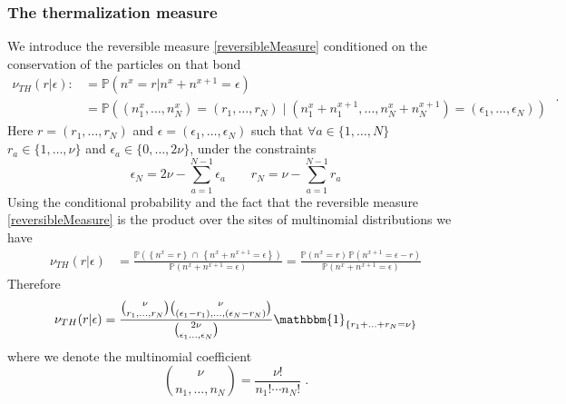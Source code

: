 \documentclass[10pt]{article}
\numberwithin{equation}{section}
\numberwithin{equation}{subsection}
\newcommand{\dt}{\;.}
\begin{document}
\subsubsection{The thermalization measure}
We introduce the reversible measure \eqref{reversibleMeasure} conditioned on the conservation of the particles on that bond
\begin{equation}
	\begin{split}
	\nu_{TH}(r|\epsilon):&=\mathbb{P}\left(n^{x}=r|n^{x}+n^{x+1}=\epsilon\right)
	\\&
	=\mathbb{P}\left((n_{1}^{x},\ldots,n_{N}^{x})=
	(r_{1},\ldots,r_{N})\;|\;(n_{1}^{x}+n_{1}^{x+1},\ldots,n_{N}^{x}+n_{N}^{x+1})=(\epsilon_{1},\ldots,\epsilon_{N})\right)
	\end{split}\dt
\end{equation}
Here $r=(r_{1},\ldots,r_{N})$ and  $\epsilon=(\epsilon_{1},\ldots,\epsilon_{N})$ such that $\forall a\in\{1,\ldots,N\}$  $r_{a}\in \{1,\ldots,\nu\}$ and $\epsilon_{a}\in \{0,\ldots,2\nu\}$, under the constraints 
\begin{equation}
	\epsilon_{N}=2\nu-\sum_{a=1}^{N-1}\epsilon_{a}\qquad r_{N}=\nu-\sum_{a=1}^{N-1}r_{a}
\end{equation}
 Using the conditional probability and the fact that the reversible measure \eqref{reversibleMeasure} is the product over the sites of multinomial distributions we have
\begin{equation}
	\begin{split}
\nu_{TH}(r|\epsilon)&=\frac{\mathbb{P}\left(\left\{n^{x}=r\right\}\,\cap\,\left\{n^{x}+n^{x+1}=\epsilon\right\}\right)}{\mathbb{P}\left(n^{x}+n^{x+1}=\epsilon\right)}=\frac{\mathbb{P}\left(n^{x}=r\right)\,\mathbb{P}\left(n^{x+1}=\epsilon-r\right)}{\mathbb{P}\left(n^{x}+n^{x+1}=\epsilon\right)}
	\end{split}
\end{equation}
Therefore 
\begin{equation}
	\begin{split}
	\nu_{TH}(r|\epsilon)=\frac{\binom{\nu}{r_{1},\ldots,r_{N}}\binom{\nu}{(\epsilon_{1}-r_{1}),\ldots,(\epsilon_{N}-r_{N})}}{\binom{2\nu}{\epsilon_{1}\ldots,\epsilon_{N}}}\mathbbm{1}_{\{r_{1}+\ldots+r_{N}=\nu\}}
	\end{split}
\end{equation}
where we denote the multinomial coefficient
\begin{equation}
	\binom{\nu}{n_{1},\ldots,n_{N}}=\frac{\nu!}{n_{1}!\cdots n_{N}!}\dt
\end{equation}
\end{document}
